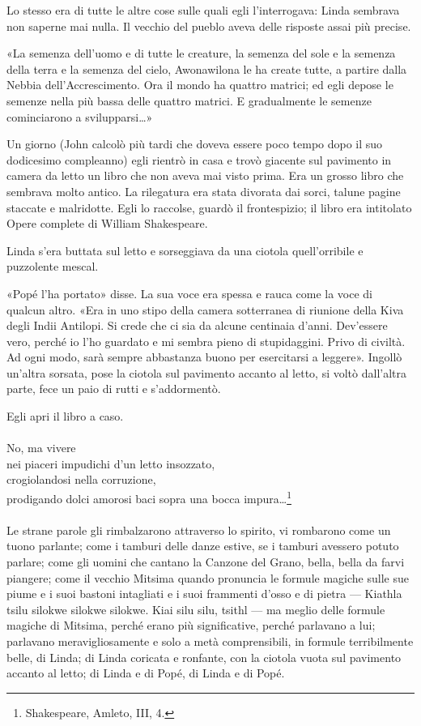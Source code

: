 \documentclass[
a5paper, %
10pt, %
twoside, 
onecolumn, %
openany, %
]{memoir}
\begin{document}
Lo stesso era di tutte le altre cose sulle quali egli l’interrogava: Linda sembrava non saperne mai nulla. Il vecchio del pueblo aveva delle risposte assai più precise.

«La semenza dell’uomo e di tutte le creature, la semenza del sole e la semenza della terra e la semenza del cielo, Awonawilona le ha create tutte, a partire dalla Nebbia dell’Accrescimento. Ora il mondo ha quattro matrici; ed egli depose le semenze nella più bassa delle quattro matrici. E gradualmente le semenze cominciarono a svilupparsi…»

Un giorno (John calcolò più tardi che doveva essere poco tempo dopo il suo dodicesimo compleanno) egli rientrò in casa e trovò giacente sul pavimento in camera da letto un libro che non aveva mai visto prima. Era un grosso libro che sembrava molto antico. La rilegatura era stata divorata dai sorci, talune pagine staccate e malridotte. Egli lo raccolse, guardò il frontespizio; il libro era intitolato Opere complete di William Shakespeare.

Linda s’era buttata sul letto e sorseggiava da una ciotola quell’orribile e puzzolente mescal.

«Popé l’ha portato» disse. La sua voce era spessa e rauca come la voce di qualcun altro. «Era in uno stipo della camera sotterranea di riunione della Kiva degli Indii Antilopi. Si crede che ci sia da alcune centinaia d’anni. Dev’essere vero, perché io l’ho guardato e mi sembra pieno di stupidaggini. Privo di civiltà. Ad ogni modo, sarà sempre abbastanza buono per esercitarsi a leggere». Ingollò un’altra sorsata, pose la ciotola sul pavimento accanto al letto, si voltò dall’altra parte, fece un paio di rutti e s’addormentò.

Egli apri il libro a caso.
\leavevmode\\\leavevmode\\
{\tiny No, ma vivere\\
nei piaceri impudichi d’un letto insozzato,\\
crogiolandosi nella corruzione,\\
prodigando dolci amorosi baci sopra una bocca impura…}\footnote{Shakespeare, Amleto, III, 4.}
\leavevmode\\\leavevmode\\
Le strane parole gli rimbalzarono attraverso lo spirito, vi rombarono come un tuono parlante; come i tamburi delle danze estive, se i tamburi avessero potuto parlare; come gli uomini che cantano la Canzone del Grano, bella, bella da farvi piangere; come il vecchio Mitsima quando pronuncia le formule magiche sulle sue piume e i suoi bastoni intagliati e i suoi frammenti d’osso e di pietra — Kiathla tsilu silokwe silokwe silokwe. Kiai silu silu, tsithl — ma meglio delle formule magiche di Mitsima, perché erano più significative, perché parlavano a lui; parlavano meravigliosamente e solo a metà comprensibili, in formule terribilmente belle, di Linda; di Linda coricata e ronfante, con la ciotola vuota sul pavimento accanto al letto; di Linda e di Popé, di Linda e di Popé.
\end{document}
